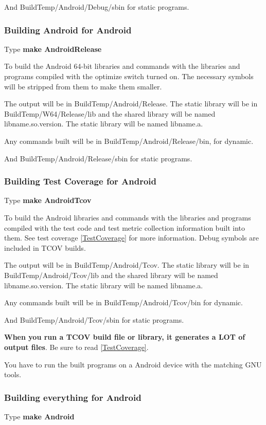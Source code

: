 And BuildTemp/Android/Debug/sbin for static programs.

\subsubsection{Building Android for Android}
Type \textbf{make AndroidRelease}

To build the Android 64-bit libraries and commands with the libraries
and programs compiled with the optimize switch turned on.
The necessary symbols will be stripped from them to make
them smaller.

The output will be in BuildTemp/Android/Release.
The static library will be in BuildTemp/W64/Release/lib
and the shared library will be named lib{name}.so.{version}.
The static library will be named lib{name}.a.
  
Any commands built will be in BuildTemp/Android/Release/bin,
for dynamic.
  
And BuildTemp/Android/Release/sbin for static programs.
  
\subsubsection{Building Test Coverage for Android}
Type \textbf{make AndroidTcov}

To build the Android libraries and commands with the libraries
and programs compiled with the test code and test metric
collection information built into them.
See test coverage \ref{TestCoverage} for more information.
Debug symbols are included in TCOV builds.

The output will be in BuildTemp/Android/Tcov.
The static library will be in BuildTemp/Android/Tcov/lib
and the shared library will be named lib{name}.so.{version}.
The static library will be named lib{name}.a.
  
Any commands built will be in BuildTemp/Android/Tcov/bin
for dynamic.

And BuildTemp/Android/Tcov/sbin for static programs.

\textbf{When you run a TCOV build file or library, it generates a LOT of  output files}. Be sure to read \ref{TestCoverage}.

You have to run the built programs on a Android device
with the matching GNU tools.
  
\subsubsection{Building everything for Android}
Type \textbf{make Android}

